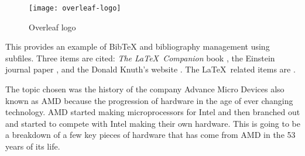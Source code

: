 \documentclass[../computer-history.tex]{subfiles}
\begin{document}
\begin{figure}[bh]
\centering
\texttt{[image: overleaf-logo]}

\label{fig:img1}
\caption{Overleaf logo}
\end{figure}

This provides an example of BibTeX and bibliography management using subfiles. Three items are cited: \textit{The \LaTeX\ Companion} book \cite{latexcompanion}, the Einstein journal paper \cite{einstein}, and the Donald Knuth's website \cite{knuthwebsite}. The \LaTeX\ related items are \cite{latexcompanion,knuthwebsite}.

The topic chosen was the history of the company Advance Micro Devices also known as AMD because the progression of hardware in the age of ever changing technology. AMD started making microprocessors for Intel and then branched out and started to compete with Intel making their own hardware. This is going to be a breakdown of a few key pieces of hardware that has come from AMD in the 53 years of its life. 



\end{document}
